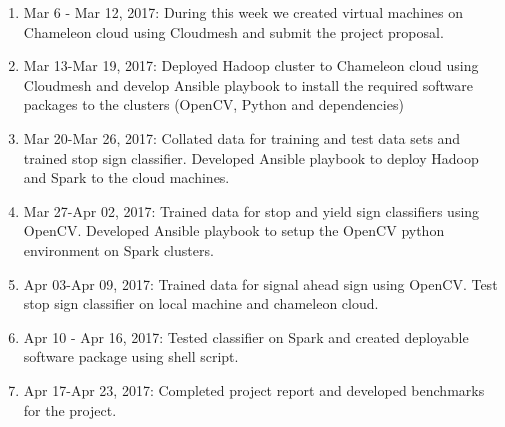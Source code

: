 \documentclass[9pt,twocolumn,twoside]{../../styles/osajnl}
\begin{document}
\begin{enumerate}
\item {Mar 6 - Mar 12, 2017:} During this week we created virtual
  machines on Chameleon cloud using Cloudmesh and submit the project
  proposal.
\item {Mar 13-Mar 19, 2017:} Deployed Hadoop cluster to Chameleon
  cloud using Cloudmesh and develop Ansible playbook to install the
  required software packages to the clusters (OpenCV, Python and
  dependencies)
\item {Mar 20-Mar 26, 2017:} Collated data for training and test data
  sets and trained stop sign classifier. Developed Ansible playbook to
  deploy Hadoop and Spark to the cloud machines.
\item {Mar 27-Apr 02, 2017:} Trained data for stop and yield sign
  classifiers using OpenCV.  Developed Ansible playbook to setup the
  OpenCV python environment on Spark clusters.
\item {Apr 03-Apr 09, 2017:} Trained data for signal ahead sign using
  OpenCV. Test stop sign classifier on local machine and chameleon
  cloud.
\item {Apr 10 - Apr 16, 2017:} Tested classifier on Spark and created
  deployable software package using shell script.
\item {Apr 17-Apr 23, 2017:} Completed project report and developed
  benchmarks for the project.
\end{enumerate}
\end{document}
